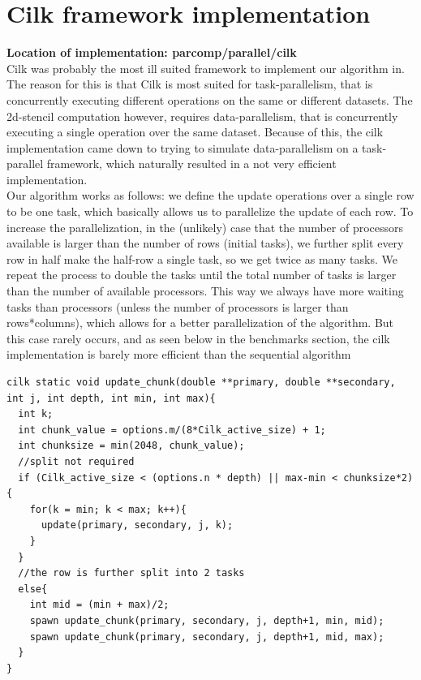 \documentclass[11pt]{article}
\begin{document}
\section{Cilk framework implementation}
\textbf{Location of implementation: parcomp/parallel/cilk}\\
Cilk was probably the most ill suited framework to implement our algorithm in. The reason for this is that Cilk is most suited for task-parallelism,
that is concurrently executing different operations on the same or different datasets. The 2d-stencil computation however, requires data-parallelism,
that is concurrently executing a single operation over the same dataset. Because of this, the cilk implementation came down to trying to simulate 
data-parallelism on a task-parallel framework, which naturally resulted in a not very efficient implementation.\\
Our algorithm works as follows: we define the update operations over a single row to be one task, which basically allows us to parallelize the update of each row.
To increase the parallelization, in the (unlikely) case that the number of processors available is larger than the number of rows (initial tasks), we further split
every row in half make the half-row a single task, so we get twice as many tasks. We repeat the process to double the tasks until the total number of tasks is larger than the
number of available processors. This way we always have more waiting tasks than processors (unless the number of processors is larger than rows*columns), which allows for a better
parallelization of the algorithm. But this case rarely occurs, and as seen below in the benchmarks section, the cilk implementation is barely more efficient than the sequential algorithm
\begin{lstlisting}[label=some-code, caption=The data-parallel update task]
cilk static void update_chunk(double **primary, double **secondary, 
int j, int depth, int min, int max){ 
  int k;
  int chunk_value = options.m/(8*Cilk_active_size) + 1; 
  int chunksize = min(2048, chunk_value);
  //split not required
  if (Cilk_active_size < (options.n * depth) || max-min < chunksize*2){ 
    for(k = min; k < max; k++){
      update(primary, secondary, j, k);
    }
  }
  //the row is further split into 2 tasks
  else{
    int mid = (min + max)/2;   
    spawn update_chunk(primary, secondary, j, depth+1, min, mid);
    spawn update_chunk(primary, secondary, j, depth+1, mid, max);
  }
}
\end{lstlisting}
\end{document}
